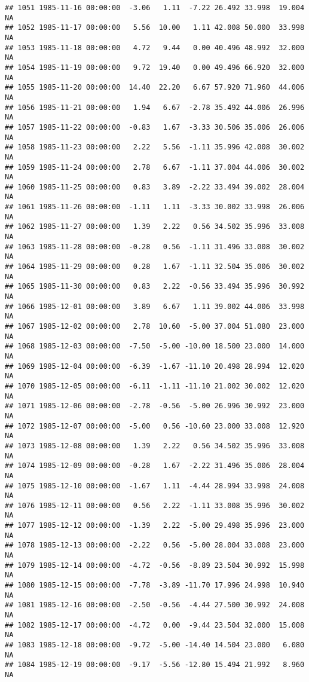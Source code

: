 \documentclass{article}\usepackage{graphicx, color}
\makeatletter
\newenvironment{kframe}{%
 \def\at@end@of@kframe{}%
 \ifinner\ifhmode%
  \def\at@end@of@kframe{\end{minipage}}%
  \begin{minipage}{\columnwidth}%
 \fi\fi%
 \def\FrameCommand##1{\hskip\@totalleftmargin \hskip-\fboxsep
 \colorbox{shadecolor}{##1}\hskip-\fboxsep
     \hskip-\linewidth \hskip-\@totalleftmargin \hskip\columnwidth}%
 \MakeFramed {\advance\hsize-\width
   \@totalleftmargin\z@ \linewidth\hsize
   \@setminipage}}%
 {\par\unskip\endMakeFramed%
 \at@end@of@kframe}
\newenvironment{knitrout}{}{} %
\makeatother
\begin{document}
\begin{knitrout}
\begin{kframe}
\begin{verbatim}
## 1051 1985-11-16 00:00:00  -3.06   1.11  -7.22 26.492 33.998  19.004     NA
## 1052 1985-11-17 00:00:00   5.56  10.00   1.11 42.008 50.000  33.998     NA
## 1053 1985-11-18 00:00:00   4.72   9.44   0.00 40.496 48.992  32.000     NA
## 1054 1985-11-19 00:00:00   9.72  19.40   0.00 49.496 66.920  32.000     NA
## 1055 1985-11-20 00:00:00  14.40  22.20   6.67 57.920 71.960  44.006     NA
## 1056 1985-11-21 00:00:00   1.94   6.67  -2.78 35.492 44.006  26.996     NA
## 1057 1985-11-22 00:00:00  -0.83   1.67  -3.33 30.506 35.006  26.006     NA
## 1058 1985-11-23 00:00:00   2.22   5.56  -1.11 35.996 42.008  30.002     NA
## 1059 1985-11-24 00:00:00   2.78   6.67  -1.11 37.004 44.006  30.002     NA
## 1060 1985-11-25 00:00:00   0.83   3.89  -2.22 33.494 39.002  28.004     NA
## 1061 1985-11-26 00:00:00  -1.11   1.11  -3.33 30.002 33.998  26.006     NA
## 1062 1985-11-27 00:00:00   1.39   2.22   0.56 34.502 35.996  33.008     NA
## 1063 1985-11-28 00:00:00  -0.28   0.56  -1.11 31.496 33.008  30.002     NA
## 1064 1985-11-29 00:00:00   0.28   1.67  -1.11 32.504 35.006  30.002     NA
## 1065 1985-11-30 00:00:00   0.83   2.22  -0.56 33.494 35.996  30.992     NA
## 1066 1985-12-01 00:00:00   3.89   6.67   1.11 39.002 44.006  33.998     NA
## 1067 1985-12-02 00:00:00   2.78  10.60  -5.00 37.004 51.080  23.000     NA
## 1068 1985-12-03 00:00:00  -7.50  -5.00 -10.00 18.500 23.000  14.000     NA
## 1069 1985-12-04 00:00:00  -6.39  -1.67 -11.10 20.498 28.994  12.020     NA
## 1070 1985-12-05 00:00:00  -6.11  -1.11 -11.10 21.002 30.002  12.020     NA
## 1071 1985-12-06 00:00:00  -2.78  -0.56  -5.00 26.996 30.992  23.000     NA
## 1072 1985-12-07 00:00:00  -5.00   0.56 -10.60 23.000 33.008  12.920     NA
## 1073 1985-12-08 00:00:00   1.39   2.22   0.56 34.502 35.996  33.008     NA
## 1074 1985-12-09 00:00:00  -0.28   1.67  -2.22 31.496 35.006  28.004     NA
## 1075 1985-12-10 00:00:00  -1.67   1.11  -4.44 28.994 33.998  24.008     NA
## 1076 1985-12-11 00:00:00   0.56   2.22  -1.11 33.008 35.996  30.002     NA
## 1077 1985-12-12 00:00:00  -1.39   2.22  -5.00 29.498 35.996  23.000     NA
## 1078 1985-12-13 00:00:00  -2.22   0.56  -5.00 28.004 33.008  23.000     NA
## 1079 1985-12-14 00:00:00  -4.72  -0.56  -8.89 23.504 30.992  15.998     NA
## 1080 1985-12-15 00:00:00  -7.78  -3.89 -11.70 17.996 24.998  10.940     NA
## 1081 1985-12-16 00:00:00  -2.50  -0.56  -4.44 27.500 30.992  24.008     NA
## 1082 1985-12-17 00:00:00  -4.72   0.00  -9.44 23.504 32.000  15.008     NA
## 1083 1985-12-18 00:00:00  -9.72  -5.00 -14.40 14.504 23.000   6.080     NA
## 1084 1985-12-19 00:00:00  -9.17  -5.56 -12.80 15.494 21.992   8.960     NA

\end{verbatim}
\end{kframe}
\end{knitrout}
\end{document}
